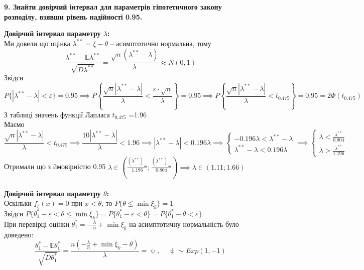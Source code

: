 \documentclass[11 pt]{article}
\begin{document}
\begin{center}
    \large
    \textbf{9. Знайти довірчий інтервал для параметрів гіпотетичного закону розподілу, взявши рівень
    надійності 0.95.}
\end{center}
\textbf{Довірчий інтервал параметру $\lambda$:} \\
Ми довели що оцінка $\lambda^{**} = \overline{\xi} - \theta$ -- асимптотично нормальна, тому
$$
\frac{\lambda^{**} - \mathbb{\mathbb{E}} \lambda^{**}}{ \sqrt{D \lambda^{**}} } =
\frac{ \sqrt{n} (\lambda^{**} - \lambda)}{\lambda} \approx N(0,1)
$$
Звідси
$$
P \{
    |\lambda^{**}-\lambda| < \varepsilon    
\} = 0.95
\implies
P \left\{
     \frac{ \sqrt{n} |\lambda^{**}-\lambda|}{\lambda} < \frac{\varepsilon \cdot \sqrt{n} }{\lambda}    
\right\} = 0.95
\implies
P \left\{
     \frac{ \sqrt{n} |\lambda^{**}-\lambda|}{\lambda} < t_{0.475}    
\right\} = 0.95 = 2\Phi(t_{0.475})
$$
З таблиці значень функції Лапласа $t_{0.475}$ =1.96
\\ 
Маємо 
$$
\frac{ \sqrt{n} |\lambda^{**}-\lambda|}{\lambda} < t_{0.475} \implies
\frac{10|\lambda^{**}-\lambda|}{\lambda} < 1.96 \implies
|\lambda^{**} - \lambda| < 0.196 \lambda \implies
\begin{cases}
    -0.196\lambda < \lambda^{**} - \lambda \\ 
    \lambda^{**} - \lambda < 0.196\lambda 
\end{cases}
\implies
\begin{cases}
    \lambda <  \frac{\lambda^{**}}{0.804} \\ 
    \lambda > \frac{\lambda^{**}}{1.196} 
\end{cases}
$$
Отримали що з ймовірністю 0.95 
$\lambda \in \left(\frac{(\lambda^{**})_{\text{зн}}}{1.196}; \frac{(\lambda^{**})_{\text{зн}}}{0.804}\right) \implies
\lambda \in (1.11; 1.66)$ 
\\ \\ 
\textbf{Довірчий інтервал параметру $\theta$:} \\
Оскільки $f_\xi(x) = 0 $ при $x < \theta $, то $P \{ \theta \leq \min \xi_k \} = 1$ \\ 
Звідси $P \{  \theta^*_1 - \varepsilon < \theta \leq \min \xi_k  \} = 
P \{  \theta^*_1 - \varepsilon < \theta \} = P \{  \theta^*_1 - \theta < \varepsilon  \}$  
\\
При перевірці оцінки $\theta^*_1 = -\frac{\lambda}{n} + \min \xi_k$ на асимптотичну нормальність було доведено: 
$$ 
 \frac{\theta^*_1 - \mathbb{E} \theta^*_1}{ \sqrt{D \theta^*_1} } = 
 \frac{n(-\frac{\lambda}{n} + \min \xi_k - \theta)}{\lambda} =
 \uppsi, \ \ \ \ \ \uppsi \sim Exp(1, -1)
$$ 
\end{document}
